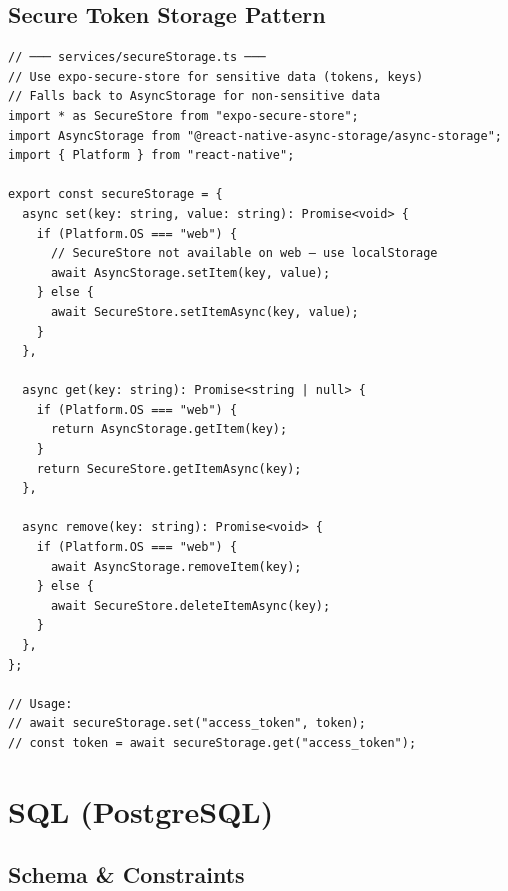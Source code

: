 \documentclass[10pt, a4paper]{article}
\begin{document}
\subsection{Secure Token Storage Pattern}


\begin{lstlisting}[language=myjs]
// ─── services/secureStorage.ts ───
// Use expo-secure-store for sensitive data (tokens, keys)
// Falls back to AsyncStorage for non-sensitive data
import * as SecureStore from "expo-secure-store";
import AsyncStorage from "@react-native-async-storage/async-storage";
import { Platform } from "react-native";

export const secureStorage = {
  async set(key: string, value: string): Promise<void> {
    if (Platform.OS === "web") {
      // SecureStore not available on web — use localStorage
      await AsyncStorage.setItem(key, value);
    } else {
      await SecureStore.setItemAsync(key, value);
    }
  },

  async get(key: string): Promise<string | null> {
    if (Platform.OS === "web") {
      return AsyncStorage.getItem(key);
    }
    return SecureStore.getItemAsync(key);
  },

  async remove(key: string): Promise<void> {
    if (Platform.OS === "web") {
      await AsyncStorage.removeItem(key);
    } else {
      await SecureStore.deleteItemAsync(key);
    }
  },
};

// Usage:
// await secureStorage.set("access_token", token);
// const token = await secureStorage.get("access_token");
\end{lstlisting}


\bigskip


\section{SQL (PostgreSQL)}


\subsection{Schema \& Constraints}
\end{document}
